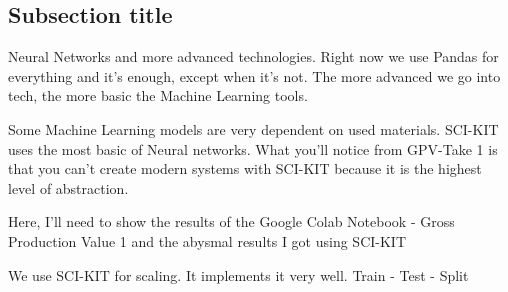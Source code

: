 \subsection{Subsection title}
Neural Networks and more advanced technologies. Right now we use Pandas for everything and it's enough, except when it's not. The more advanced we go into tech, the more basic the Machine Learning tools.

Some Machine Learning models are very dependent on used materials. SCI-KIT uses the most basic of Neural networks. What you'll notice from GPV-Take 1 is that you can't create modern systems with SCI-KIT because it is the highest level of abstraction.

Here, I'll need to show the results of the Google Colab Notebook - Gross Production Value 1 and the abysmal results I got using SCI-KIT

We use SCI-KIT for scaling. It implements it very well. Train - Test - Split
\cite{ponce1989engineering}
